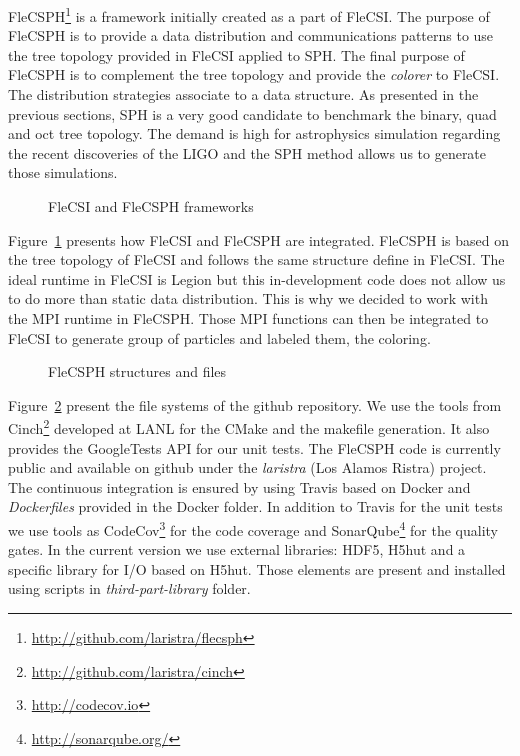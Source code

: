 FleCSPH\footnote{\url{http://github.com/laristra/flecsph}} is a framework initially created as a part of FleCSI. 
The purpose of FleCSPH is to provide a data distribution and communications patterns to use the tree topology provided in FleCSI applied to SPH.
The final purpose of FleCSPH is to complement the tree topology and provide the \textit{colorer} to FleCSI. 
The distribution strategies associate to a data structure.
As presented in the previous sections, SPH is a very good candidate to benchmark the binary, quad and oct tree topology. 
The demand is high for astrophysics simulation regarding the recent discoveries of the LIGO and the SPH method allows us to generate those simulations. 
\begin{figure}[t!]
\centering

\caption{FleCSI and FleCSPH frameworks }
\label{fig:flecsi_flecsph_framework}
\end{figure}
Figure~\ref{fig:flecsi_flecsph_framework} presents how FleCSI and FleCSPH are integrated. 
FleCSPH is based on the tree topology of FleCSI and follows the same structure define in FleCSI. 
The ideal runtime in FleCSI is Legion but this in-development code does not allow us to do more than static data distribution. 
This is why we decided to work with the MPI runtime in FleCSPH. 
Those MPI functions can then be integrated to FleCSI to generate group of particles and labeled them, the coloring. 

\begin{figure}[t!]
\centering

\caption{FleCSPH structures and files}
\label{fig:files_flecsph}
\end{figure}

Figure~\ref{fig:files_flecsph} present the file systems of the github repository. 
We use the tools from Cinch\footnote{\url{http://github.com/laristra/cinch}} developed at LANL for the CMake and the makefile generation. 
It also provides the GoogleTests API for our unit tests. 
The FleCSPH code is currently public and available on github under the \textit{laristra} (Los Alamos Ristra) project.
The continuous integration is ensured by using Travis based on Docker and \textit{Dockerfiles} provided in the Docker folder. 
In addition to Travis for the unit tests we use tools as CodeCov\footnote{\url{http://codecov.io}} for the code coverage and SonarQube\footnote{\url{http://sonarqube.org/}} for the quality gates. 
In the current version we use external libraries: HDF5, H5hut and a specific library for I/O based on H5hut. 
Those elements are present and installed using scripts in \textit{third-part-library} folder. 

